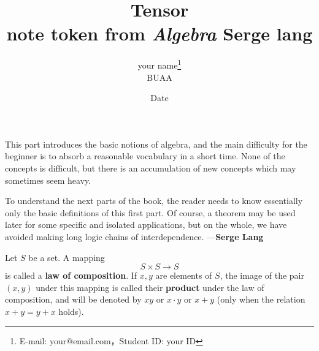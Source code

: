 \documentclass[a4paper, 11pt]{article}
\newcommand{\xiaosihao}{\fontsize{12pt}{\baselineskip}\selectfont}
\begin{document}
\begin{CJK}{UTF8}{gbsn}

\newtheorem{example}{例}             %
\newtheorem{algorithm}{算法}
\newtheorem{theorem}{定理}[section]  %
\newtheorem{definition}{定义}
\newtheorem{axiom}{公理}
\newtheorem{property}{性质}
\newtheorem{proposition}{命题}
\newtheorem{lemma}{引理}
\newtheorem{corollary}{推论}
\newtheorem{remark}{注解}
\newtheorem{condition}{条件}
\newtheorem{conclusion}{结论}
\newtheorem{assumption}{假设}

\renewcommand{\contentsname}{目录}  %
\renewcommand{\abstractname}{摘要}  %
\renewcommand{\refname}{参考文献}   %
\renewcommand{\indexname}{索引}
\renewcommand{\figurename}{图}
\renewcommand{\tablename}{表}
\renewcommand{\appendixname}{附录}
\renewcommand{\algorithm}{算法}


\title{\textbf{Tensor}\\note token from \textit{Algebra} \textbf{Serge lang}}
\author{your name\footnote{E-mail: your@email.com，Student ID: your ID}\\[2ex]
\xiaosihao BUAA\\[2ex]
}
\date{Date}


\maketitle

\newpage

This part introduces the basic notions of algebra, and the main difficulty for the beginner is to absorb a reasonable vocabulary in a short time.
None of the concepts is difficult, but there is an accumulation of new concepts which may sometimes seem heavy.\par
To understand the next parts of the book, the reader needs to know essentially only the basic definitions of this first part. Of course, a theorem may be used later for
some specific and isolated applications, but on the whole, we have avoided making long logic chains of interdependence.  ---\textbf{Serge Lang}

Let $S$ be a set. A mapping
\[S \times S \longrightarrow S\]
is called a \textbf{law of composition}. If $x, y$ are elements of $S$, the image of the pair $(x, y)$ under this mapping is called their \textbf{product} under the 
law of composition, and will be denoted by $xy$ or $x \cdot y$ or $x + y$ (only when the relation $x + y = y + x$ holds).\par


\end{CJK}
\end{document}
